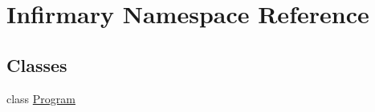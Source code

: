 \hypertarget{namespace_infirmary}{}\section{Infirmary Namespace Reference}
\label{namespace_infirmary}
\subsection*{Classes}
\begin{DoxyCompactItemize}
\item 
class \mbox{\hyperlink{class_infirmary_1_1_program}{Program}}
\end{DoxyCompactItemize}

